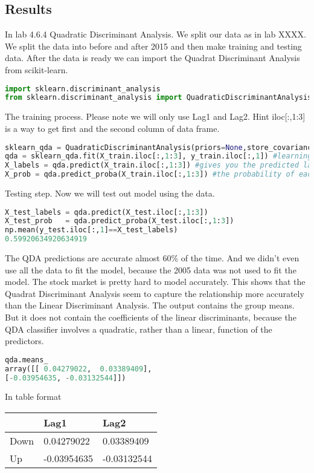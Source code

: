 \subsection{Results}
In lab 4.6.4 Quadratic Discriminant Analysis. We split our data as in lab XXXX. We split the data into before and after 2015 and then make training and testing data. After the data is ready we can import the Quadrat Discriminant Analysis from scikit-learn.
\begin{lstlisting}[language=Python]
import sklearn.discriminant_analysis
from sklearn.discriminant_analysis import QuadraticDiscriminantAnalysis
\end{lstlisting}
The training process. Please note we will only use Lag1 and Lag2. Hint iloc[:,1:3] is a way to get first and the second column of data frame.
\begin{lstlisting}[language=Python]
sklearn_qda = QuadraticDiscriminantAnalysis(priors=None,store_covariance=True) #creating a QDA object
qda = sklearn_qda.fit(X_train.iloc[:,1:3], y_train.iloc[:,1]) #learning the projection matrix
X_labels = qda.predict(X_train.iloc[:,1:3]) #gives you the predicted label for each sample
X_prob = qda.predict_proba(X_train.iloc[:,1:3]) #the probability of each sample to belong to each class
\end{lstlisting}
Testing step. Now we will test out model using the data.
\begin{lstlisting}[language=Python]
X_test_labels = qda.predict(X_test.iloc[:,1:3])
X_test_prob   = qda.predict_proba(X_test.iloc[:,1:3])
np.mean(y_test.iloc[:,1]==X_test_labels)
0.59920634920634919
\end{lstlisting}
The QDA predictions are accurate almost 60\% of the time. And we didn't even use all the data to fit the model, because the 2005 data was not used to fit the model. The stock market is pretty hard to model accurately.
This shows that the Quadrat Discriminant Analysis seem to capture the relationship more accurately than the Linear Discriminant Analysis. The output contains the group means. But it does not contain the coefficients of the linear discriminants, because the QDA classifier involves a quadratic, rather than a linear, function of the predictors.

\begin{lstlisting}[language=Python]
qda.means_
array([[ 0.04279022,  0.03389409],
[-0.03954635, -0.03132544]])
\end{lstlisting}
In table format
\begin{longtable}[]{@{}lll@{}}
	\toprule
	& Lag1 & Lag2\tabularnewline
	\midrule
	\endhead
	Down & 0.04279022 & 0.03389409\tabularnewline
	Up & -0.03954635 & -0.03132544\tabularnewline
	\bottomrule
\end{longtable}